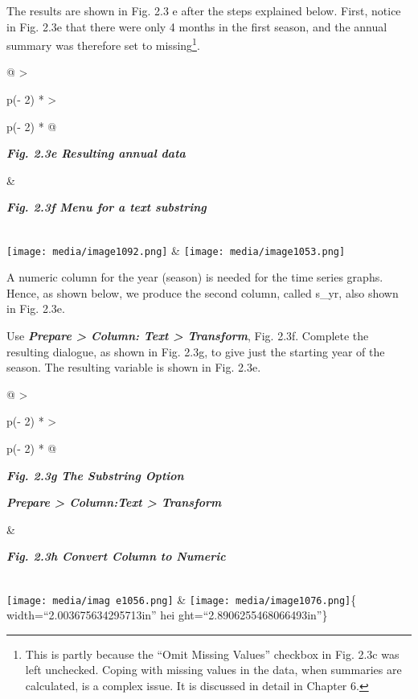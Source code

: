 \documentclass[
  letterpaper,
  DIV=11,
  numbers=noendperiod]{scrreprt}
\begin{document}
The results are shown in Fig. 2.3 e after the steps explained below.
First, notice in Fig. 2.3e that there were only 4 months in the first
season, and the annual summary was therefore set to missing\footnote{This
  is partly because the ``Omit Missing Values'' checkbox in Fig. 2.3c
  was left unchecked. Coping with missing values in the data, when
  summaries are calculated, is a complex issue. It is discussed in
  detail in Chapter 6.}.

\begin{longtable}[]{@{}
  >{\raggedright\arraybackslash}p{(\columnwidth - 2\tabcolsep) * }
  >{\raggedright\arraybackslash}p{(\columnwidth - 2\tabcolsep) * }@{}}
\toprule\noalign{}
\begin{minipage}[b]{\linewidth}\raggedright
\textbf{\emph{Fig. 2.3e Resulting annual data}}
\end{minipage} & \begin{minipage}[b]{\linewidth}\raggedright
\textbf{\emph{Fig. 2.3f Menu for a text substring}}
\end{minipage} \\
\midrule\noalign{}
\endhead
\bottomrule\noalign{}
\endlastfoot
\texttt{[image: media/image1092.png]}
&
\texttt{[image: media/image1053.png]} \\
\end{longtable}

A numeric column for the year (season) is needed for the time series
graphs. Hence, as shown below, we produce the second column, called
s\_yr, also shown in Fig. 2.3e.

Use \textbf{\emph{Prepare \textgreater{} Column: Text \textgreater{}
Transform}}, Fig. 2.3f. Complete the resulting dialogue, as shown in
Fig. 2.3g, to give just the starting year of the season. The resulting
variable is shown in Fig. 2.3e.

\begin{longtable}[]{@{}
  >{\raggedright\arraybackslash}p{(\columnwidth - 2\tabcolsep) * }
  >{\raggedright\arraybackslash}p{(\columnwidth - 2\tabcolsep) * }@{}}
\toprule\noalign{}
\begin{minipage}[b]{\linewidth}\raggedright
\textbf{\emph{Fig. 2.3g The Substring Option}}

\textbf{\emph{Prepare \textgreater{} Column:Text \textgreater{}
Transform}}
\end{minipage} & \begin{minipage}[b]{\linewidth}\raggedright
\textbf{\emph{Fig. 2.3h Convert Column to Numeric}}
\end{minipage} \\
\midrule\noalign{}
\endhead
\bottomrule\noalign{}
\endlastfoot
\texttt{[image: media/imag e1056.png]}
& \texttt{[image: media/image1076.png]}\{ width=``2.003675634295713in''
hei ght=``2.8906255468066493in''\} \\
\end{longtable}
\end{document}
